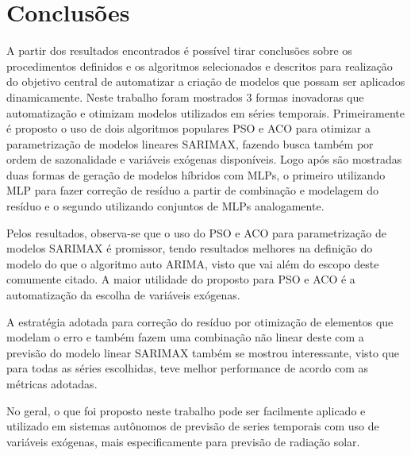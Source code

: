 \chapter{Conclusões}
\label{cap:conclusoes}

%
%

A partir dos resultados encontrados é possível tirar conclusões sobre os procedimentos definidos e os algoritmos selecionados e descritos para realização do objetivo central de automatizar a criação de modelos que possam ser aplicados dinamicamente. Neste trabalho foram mostrados 3 formas inovadoras que automatização e otimizam modelos utilizados em séries temporais. Primeiramente é proposto o uso de dois algoritmos populares PSO e ACO para otimizar a parametrização de modelos lineares SARIMAX, fazendo busca também por ordem de sazonalidade e variáveis exógenas disponíveis. Logo após são mostradas duas formas de geração de modelos híbridos com MLPs, o primeiro utilizando MLP para fazer correção de resíduo a partir de combinação e modelagem do resíduo e o segundo utilizando conjuntos de MLPs analogamente.

Pelos resultados, observa-se que o uso do PSO e ACO para parametrização de modelos SARIMAX é promissor, tendo resultados melhores na definição do modelo do que o algoritmo auto ARIMA, visto que vai além do escopo deste comumente citado. A maior utilidade do proposto para PSO e ACO é a automatização da escolha de variáveis exógenas.

A estratégia adotada para correção do resíduo por otimização de elementos que modelam o erro e também fazem uma combinação não linear deste com a previsão do modelo linear SARIMAX também se mostrou interessante, visto que para todas as séries escolhidas, teve melhor performance de acordo com as métricas adotadas.

No geral, o que foi proposto neste trabalho pode ser facilmente aplicado e utilizado em sistemas autônomos de previsão de series temporais com uso de variáveis exógenas, mais especificamente para previsão de radiação solar.